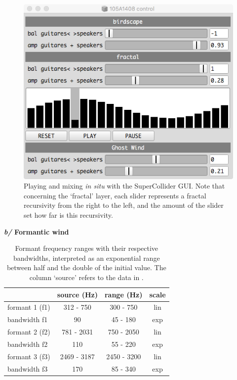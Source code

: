 \begin{figure}[hbt]
\begin{center}
	\includegraphics[scale=0.48]{img/9809}		
\caption{Playing and mixing \textit{in situ} with the SuperCollider GUI. Note that concerning the `fractal' layer, each slider represents a fractal recursivity from the right to the left, and the amount of the slider set how far is this recursivity.}
\label{hk}
\end{center}
\end{figure}

  \textbf{\textit{b/} Formantic wind}
  
  \smallskip 
  
  \begin{table}[htp]
\begin{center}
{\ttfamily
\begin{tabular}{|l|c|c|c|}
\cline{2-4}
    \multicolumn{1}{c|}{} & source (Hz) & range (Hz) & scale \\ 
    \hline 
    formant 1 (f1) & 312 - 750 & 300 - 750 & lin \\ 
 \hline
 bandwidth f1 & 90 & 45 - 180 & exp \\ 
 \hline
 formant 2 (f2) & 781 - 2031 & 750 - 2050 & lin \\ 
 \hline
 bandwidth f2 & 110 & 55 - 220 & exp \\ 
 \hline
 formant 3 (f3) & 2469 - 3187 & 2450 - 3200 & lin \\ 
 \hline
 bandwidth f3 & 170 & 85 - 340 & exp \\ 
 \hline
\end{tabular}}
\caption{Formant frequency ranges with their respective bandwidths, interpreted as an exponential range between half and the double of the initial value. The column `source' refers to the data in \citep{adc}.}
\end{center}
\label{default}
\end{table}%

	
	
	
	
